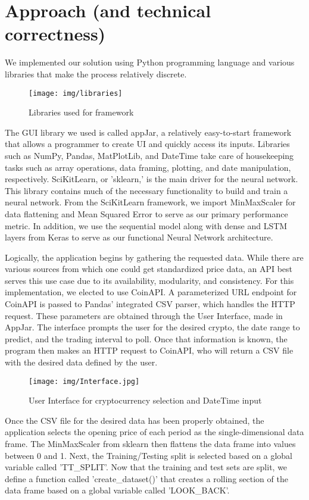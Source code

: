 \documentclass[compsoc]{IEEEtran}
\begin{document}

\section{Approach (and technical correctness)}

We implemented our solution using Python programming language and various libraries that make the process relatively discrete. 
\begin{figure}[h!]
\texttt{[image: img/libraries]}
\caption{Libraries used for framework}
\end{figure}

The GUI library we used is called appJar, a relatively easy-to-start framework that allows a programmer to create UI and quickly access its inputs. Libraries such as NumPy, Pandas, MatPlotLib, and DateTime take care of housekeeping tasks such as array operations, data framing, plotting, and date manipulation, respectively. SciKitLearn, or 'sklearn,' is the main driver for the neural network. This library contains much of the necessary functionality to build and train a neural network. From the SciKitLearn framework, we import MinMaxScaler for data flattening and Mean Squared Error to serve as our primary performance metric. In addition, we use the sequential model along with dense and LSTM layers from Keras to serve as our functional Neural Network architecture.

Logically, the application begins by gathering the requested data. While there are various sources from which one could get standardized price data, an API best serves this use case due to its availability, modularity, and consistency. For this implementation, we elected to use CoinAPI. A parameterized URL endpoint for CoinAPI\cite{coinapi.io} is passed to Pandas' integrated CSV parser, which handles the HTTP request. These parameters are obtained through the User Interface, made in AppJar.
The interface prompts the user for the desired crypto, the date range to predict, and the trading interval to poll. Once that information is known, the program then makes an HTTP request to CoinAPI\cite{coinapi.io}, who will return a CSV file with the desired data defined by the user.
\begin{figure}[h!]
\texttt{[image: img/Interface.jpg]}
\caption{User Interface for cryptocurrency selection and DateTime input}
\end{figure}

Once the CSV file for the desired data has been properly obtained, the application selects the opening price of each period as the single-dimensional data frame. The MinMaxScaler from sklearn then flattens the data frame into values between 0 and 1. Next, the Training/Testing split is selected based on a global variable called 'TT\_SPLIT'. Now that the training and test sets are split, we define a function called 'create\_dataset()' that creates a rolling section of the data frame based on a global variable called 'LOOK\_BACK'.
\end{document}
